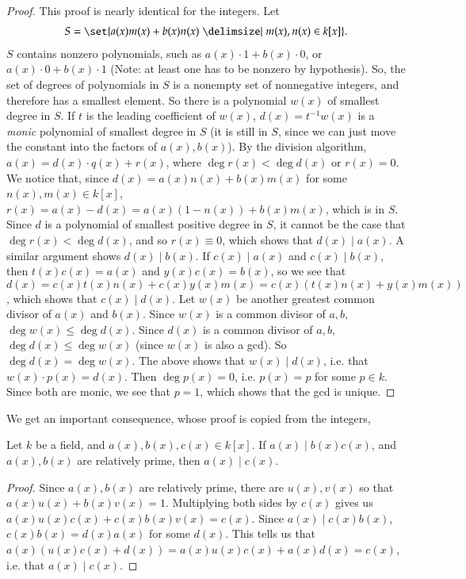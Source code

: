 \documentclass[12pt]{article}
\newenvironment{theorem}{\begin{mytheorem}}{\end{mytheorem}}
\theoremstyle{definitionstyle}
\begin{document}
\begin{proof}
	This proof is nearly identical for the integers. Let 
	\begin{align*}
		S = \set{a(x)m(x) + b(x)n(x) \given m(x), n(x) \in k[x]}.
	\end{align*} $S$ contains nonzero polynomials, such as $a(x) \cdot 1 + b(x) \cdot 0$, or $a(x) \cdot 0 + b(x) \cdot 1$ (Note: at least one has to be nonzero by hypothesis). So, the set of degrees of polynomials in $S$ is a nonempty set of nonnegative integers, and therefore has a smallest element. So there is a polynomial $w(x)$ of smallest degree in $S$. If $t$ is the leading coefficient of $w(x)$, $d(x) = t^{-1}w(x)$ is a \textit{monic} polynomial of smallest degree in $S$ (it is still in $S$, since we can just move the constant into the factors of $a(x), b(x)$). By the division algorithm, $a(x) = d(x) \cdot q(x) + r(x)$, where $\deg{r(x)} < \deg{d(x)}$ or $r(x) = 0$. We notice that, since $d(x) = a(x)n(x) + b(x)m(x)$ for some $n(x), m(x) \in k[x]$, $r(x) = a(x)-d(x) = a(x)(1-n(x))+b(x)m(x)$, which is in $S$. Since $d$ is a polynomial of smallest positive degree in $S$, it cannot be the case that $\deg{r(x)} < \deg{d(x)}$, and so $r(x) \equiv 0$, which shows that $d(x) \mid a(x)$. A similar argument shows $d(x) \mid b(x)$. If $c(x) \mid a(x)$ and $c(x) \mid b(x)$, then $t(x)c(x) = a(x)$ and $y(x)c(x) = b(x)$, so we see that $d(x) = c(x)t(x)n(x) + c(x)y(x)m(x) = c(x)(t(x)n(x) + y(x)m(x))$, which shows that $c(x) \mid d(x)$. Let $w(x)$ be another greatest common divisor of $a(x)$ and $b(x)$. Since $w(x)$ is a common divisor of $a, b$, $\deg w(x) \leq \deg d(x)$. Since $d(x)$ is a common divisor of $a, b$, $\deg d(x) \leq \deg w(x)$ (since $w(x)$ is also a gcd). So $\deg d(x) = \deg w(x)$. The above shows that $w(x) \mid d(x)$, i.e. that $w(x) \cdot p(x) = d(x)$. Then $\deg p(x) = 0$, i.e. $p(x) = p$ for some $p \in k$. Since both are monic, we see that $p = 1$, which shows that the gcd is unique.
\end{proof}
We get an important consequence, whose proof is copied from the integers,
\begin{theorem}
	Let $k$ be a field, and $a(x), b(x), c(x) \in k[x]$. If $a(x) \mid b(x) c(x)$, and $a(x), b(x)$ are relatively prime, then $a(x) \mid c(x)$.
\end{theorem}
\begin{proof}
	Since $a(x), b(x)$ are relatively prime, there are $u(x), v(x)$ so that $a(x)u(x) + b(x)v(x) = 1$. Multiplying both sides by $c(x)$ gives us $a(x)u(x)c(x) + c(x)b(x)v(x) = c(x)$. Since $a(x) \mid c(x)b(x)$, $c(x)b(x) = d(x)a(x)$ for some $d(x)$. This tells us that $a(x)(u(x)c(x)+d(x))=a(x)u(x)c(x) + a(x)d(x) = c(x)$, i.e. that $a(x) \mid c(x)$.
\end{proof}
\end{document}
